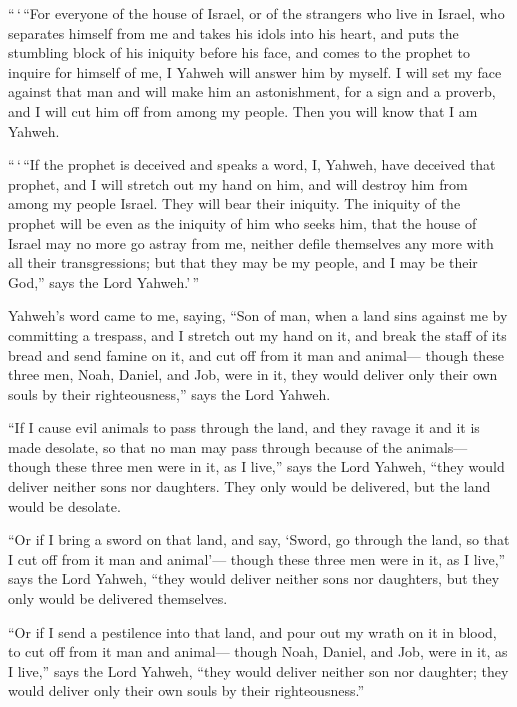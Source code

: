  ``\,`\,``For everyone of the house of Israel, or of the
strangers who live in Israel, who separates himself from me and takes
his idols into his heart, and puts the stumbling block of his iniquity
before his face, and comes to the prophet to inquire for himself of me,
I Yahweh will answer him by myself.  I will set my face
against that man and will make him an astonishment, for a sign and a
proverb, and I will cut him off from among my people. Then you will know
that I am Yahweh.

 ``\,`\,``If the prophet is deceived and speaks a word, I,
Yahweh, have deceived that prophet, and I will stretch out my hand on
him, and will destroy him from among my people Israel. 
They will bear their iniquity. The iniquity of the prophet will be even
as the iniquity of him who seeks him,  that the house of
Israel may no more go astray from me, neither defile themselves any more
with all their transgressions; but that they may be my people, and I may
be their God,'' says the Lord Yahweh.'\,''

 Yahweh's word came to me, saying,  ``Son of
man, when a land sins against me by committing a trespass, and I stretch
out my hand on it, and break the staff of its bread and send famine on
it, and cut off from it man and animal---  though these
three men, Noah, Daniel, and Job, were in it, they would deliver only
their own souls by their righteousness,'' says the Lord Yahweh.

 ``If I cause evil animals to pass through the land, and
they ravage it and it is made desolate, so that no man may pass through
because of the animals---  though these three men were in
it, as I live,'' says the Lord Yahweh, ``they would deliver neither sons
nor daughters. They only would be delivered, but the land would be
desolate.

 ``Or if I bring a sword on that land, and say, `Sword, go
through the land, so that I cut off from it man and animal'---
 though these three men were in it, as I live,'' says the
Lord Yahweh, ``they would deliver neither sons nor daughters, but they
only would be delivered themselves.

 ``Or if I send a pestilence into that land, and pour out
my wrath on it in blood, to cut off from it man and animal---
 though Noah, Daniel, and Job, were in it, as I live,''
says the Lord Yahweh, ``they would deliver neither son nor daughter;
they would deliver only their own souls by their righteousness.''

